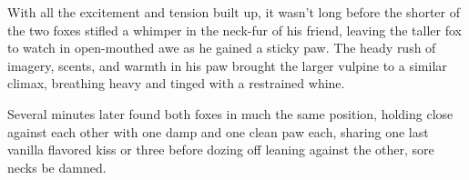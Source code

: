 With all the excitement and tension built up, it wasn't long before the shorter of the two foxes stifled a whimper in the neck-fur of his friend, leaving the taller fox to watch in open-mouthed awe as he gained a sticky paw. The heady rush of imagery, scents, and warmth in his paw brought the larger vulpine to a similar climax, breathing heavy and tinged with a restrained whine.

Several minutes later found both foxes in much the same position, holding close against each other with one damp and one clean paw each, sharing one last vanilla flavored kiss or three before dozing off leaning against the other, sore necks be damned.
